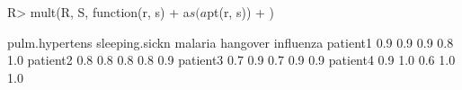 \begin{Schunk}
% --begin: "comp.mult"
\begin{Sinput}
R> mult(R, S, function(r, s) {
+      a$s(a$pt(r, s))
+  })
\end{Sinput}
\begin{Soutput}
         pulm.hypertens sleeping.sickn malaria hangover influenza
patient1            0.9            0.9     0.9      0.8       1.0
patient2            0.8            0.8     0.8      0.8       0.9
patient3            0.7            0.9     0.7      0.9       0.9
patient4            0.9            1.0     0.6      1.0       1.0
\end{Soutput}
%
% --end: "comp.mult"
\end{Schunk}
